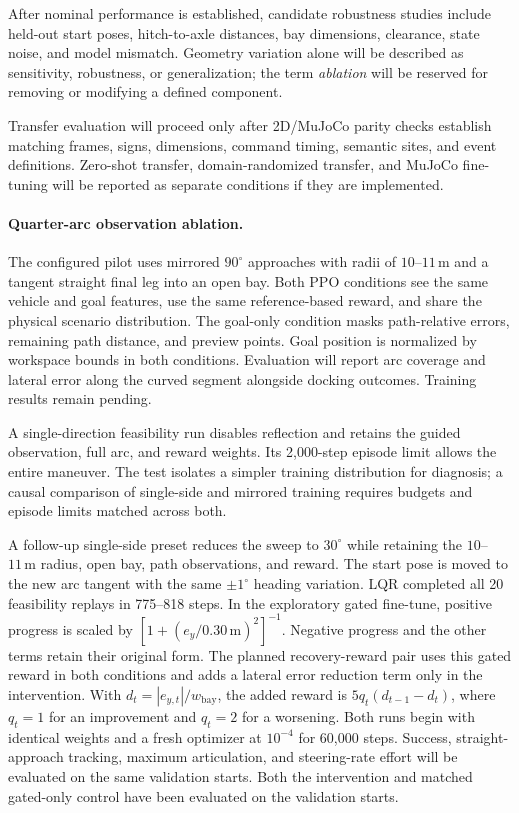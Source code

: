 After nominal performance is established, candidate robustness studies include
held-out start poses, hitch-to-axle distances, bay dimensions, clearance, state
noise, and model mismatch. Geometry variation alone will be described as
sensitivity, robustness, or generalization; the term \emph{ablation} will be
reserved for removing or modifying a defined component.

Transfer evaluation will proceed only after 2D/MuJoCo parity checks establish
matching frames, signs, dimensions, command timing, semantic sites, and event
definitions. Zero-shot transfer, domain-randomized transfer, and MuJoCo
fine-tuning will be reported as separate conditions if they are implemented.
\paragraph{Quarter-arc observation ablation.}
The configured pilot uses mirrored $90^\circ$ approaches with radii of
$10$--$11\,\mathrm{m}$ and a tangent straight final leg into an open bay.
Both PPO conditions see the same vehicle and goal features, use the same
reference-based reward, and share the physical scenario distribution.
The goal-only condition masks path-relative errors, remaining path
distance, and preview points. Goal position is normalized by workspace
bounds in both conditions. Evaluation will report arc coverage and
lateral error along the curved segment alongside docking outcomes.
Training results remain pending.

A single-direction feasibility run disables reflection and retains the
guided observation, full arc, and reward weights. Its 2,000-step episode
limit allows the entire maneuver. The test isolates a simpler training
distribution for diagnosis; a causal comparison of single-side and
mirrored training requires budgets and episode limits matched across both.

A follow-up single-side preset reduces the sweep to $30^\circ$ while
retaining the $10$--$11\,\mathrm{m}$ radius, open bay, path observations,
and reward. The start pose is moved to the new arc tangent with the same
$\pm1^\circ$ heading variation. LQR completed all 20 feasibility replays
in 775--818 steps. In the exploratory gated fine-tune, positive progress
is scaled by $[1+(e_y/0.30\,\mathrm{m})^2]^{-1}$. Negative progress and the
other terms retain their original form. The planned recovery-reward pair
uses this gated reward in both conditions and adds a lateral error
reduction term only in the intervention. With
$d_t=|e_{y,t}|/w_{\mathrm{bay}}$, the added reward is
$5q_t(d_{t-1}-d_t)$, where $q_t=1$ for an improvement and $q_t=2$ for a
worsening. Both runs begin with identical weights and a fresh optimizer
at $10^{-4}$ for 60,000 steps. Success, straight-approach tracking,
maximum articulation, and steering-rate effort will be evaluated on
the same validation starts. Both the intervention and matched
gated-only control have been evaluated on the validation starts.
